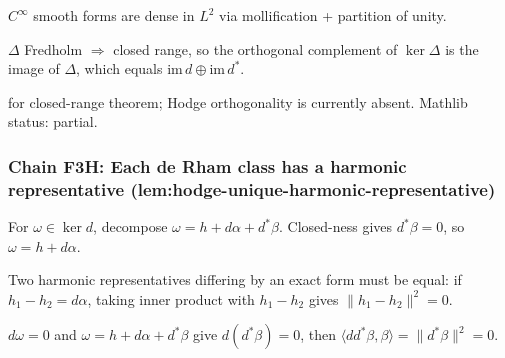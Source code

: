 \begin{lemma}
\label{lem:hod-r3}
$C^{\infty}$ smooth forms are dense in $L^{2}$ via mollification + partition of unity.
\leanok
\end{lemma}

\begin{lemma}
\label{lem:hod-r4}
$\Delta$ Fredholm $\Rightarrow$ closed range, so the orthogonal complement of $\ker\Delta$ is the image of $\Delta$, which equals $\mathrm{im}\,d \oplus \mathrm{im}\,d^{*}$.
\leanok\mathlibok
\end{lemma}

\begin{lemma}
\label{lem:hod-r5}
 for closed-range theorem; Hodge orthogonality is currently absent.  Mathlib status: partial.
\leanok
\end{lemma}

\subsubsection*{Chain F3H: Each de Rham class has a harmonic representative (lem:hodge-unique-harmonic-representative)}

\begin{lemma}
\label{lem:huh-r1}
For $\omega \in \ker d$, decompose $\omega = h + d\alpha + d^{*}\beta$.  Closed-ness gives $d^{*}\beta = 0$, so $\omega = h + d\alpha$.
\leanok
\end{lemma}

\begin{lemma}
\label{lem:huh-r2}
Two harmonic representatives differing by an exact form must be equal: if $h_{1} - h_{2} = d\alpha$, taking inner product with $h_{1}-h_{2}$ gives $\|h_{1}-h_{2}\|^{2} = 0$.
\leanok
\end{lemma}

\begin{lemma}[Pass F3H.3: $d^{*}\beta = 0$ from $d\omega = 0$]
\label{lem:huh-r3}
$d\omega = 0$ and $\omega = h + d\alpha + d^{*}\beta$ give $d(d^{*}\beta) = 0$, then $\langle dd^{*}\beta, \beta\rangle = \|d^{*}\beta\|^{2} = 0$.
\leanok
\end{lemma}


